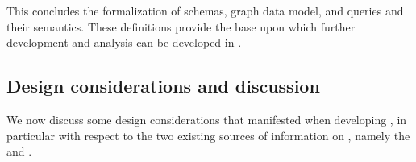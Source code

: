 

This concludes the formalization of \gql schemas, graph data model, and queries and their semantics.  These definitions provide the base upon which further development and analysis can be developed in \gcoql.


\subsection{Design considerations and discussion}\label{subsec:discussion}

We now discuss some design considerations that manifested when developing 
\gcoql, in particular with respect to the two existing sources of information on \gql, namely the \spec and \HP.

